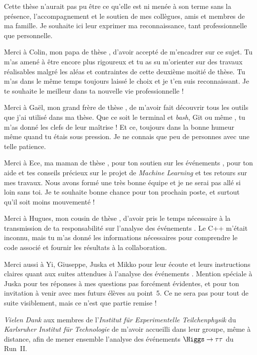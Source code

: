 Cette thèse n'aurait pas pu être ce qu'elle est
ni menée à son terme
sans la présence, l'accompagnement et le soutien
de mes collègues, amis et membres de ma famille.
Je souhaite ici leur exprimer ma reconnaissance,
tant professionnelle que personnelle.
\par
Merci à Colin, mon \og papa de thèse \fg,
d'avoir accepté de m'encadrer sur ce sujet.
Tu m'as amené à être encore plus rigoureux
et
tu as su m'orienter sur des travaux réalisables
malgré les aléas et contraintes de cette deuxième moitié de thèse.
Tu m'as dans le même temps toujours laissé le choix et je t'en suis reconnaissant.
Je te souhaite le meilleur dans ta nouvelle vie professionnelle !
\par
Merci à Gaël, mon \og grand frère de thèse \fg,
de m'avoir fait découvrir tous les outils que j'ai utilisé dans ma thèse.
Que ce soit le terminal et \emph{bash}, Git ou même \HEPPY,
tu m'as donné les clefs de leur maîtrise !
Et ce, toujours dans la bonne humeur même quand tu étais sous pression.
Je ne connais que peu de personnes avec une telle patience.
\par
Merci à Ece, ma \og maman de thèse \fg,
pour ton soutien sur les événements \Gjets,
pour ton aide et tes conseils précieux sur le projet de \emph{Machine Learning}
et tes retours sur mes travaux.
Nous avons formé une très bonne équipe
et
je ne serai pas allé si loin sans toi.
Je te souhaite bonne chance pour ton prochain poste,
et surtout qu'il soit moins mouvementé !
\par
Merci à Hugues, mon \og cousin de thèse \fg,
d'avoir pris le temps nécessaire à la transmission
de ta responsabilité sur l'analyse des événements \Gjets.
Le C++ m'était inconnu,
mais tu m'as donné les informations nécessaires pour comprendre
le code associé et fournir les résultats à la collaboration.
\par
Merci aussi à
Yi,
Giuseppe,
Juska
et
Mikko
pour leur écoute et leurs instructions claires
quant aux suites attendues à l'analyse des événements \Gjets.
Mention spéciale à Juska pour tes réponses à mes questions pas forcément évidentes,
et pour ton invitation à venir avec mes futurs élèves au point~5.
Ce ne sera pas pour tout de suite visiblement, mais ce n'est que partie remise !
\par
\emph{Vielen Dank} aux membres de l'\emph{Institut für Experimentelle Teilchenphysik}
du \emph{Karlsruher Institut für Technologie}
de m'avoir accueilli dans leur groupe, même à distance,
afin de mener ensemble l'analyse des événements $\Higgs\to\tau\tau$ du Run~II.
